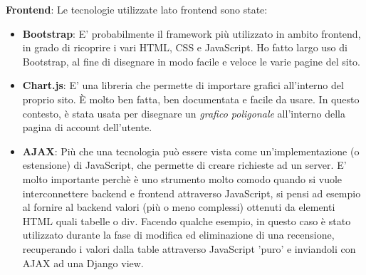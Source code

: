 \documentclass[12pt]{article}
\begin{document}
	\noindent \textbf{Frontend}: Le tecnologie utilizzate lato frontend sono state: 
	\begin{itemize}
		\item \textbf{Bootstrap}: E' probabilmente il framework più utilizzato in ambito frontend, in grado di ricoprire i vari HTML, CSS e JavaScript. Ho fatto largo uso di Bootstrap, al fine di disegnare in modo facile e veloce le varie pagine del sito. \\
		
		\item \textbf{Chart.js}: E' una libreria che permette di importare grafici all'interno del proprio sito. È molto ben fatta, ben documentata e facile da usare. In questo contesto, è stata usata per disegnare un \textit{grafico poligonale} all'interno della pagina di account dell'utente. \\
		
		\item \textbf{AJAX}: Più che una tecnologia può essere vista come un'implementazione (o estensione) di JavaScript, che permette di creare richieste ad un server. E' molto importante perchè è uno strumento molto comodo quando si vuole interconnettere backend e frontend attraverso JavaScript, si pensi ad esempio al fornire al backend valori (più o meno complessi) ottenuti da elementi HTML quali tabelle o div. Facendo qualche esempio, in questo caso è stato utilizzato durante la fase di modifica ed eliminazione di una recensione, recuperando i valori dalla table attraverso JavaScript 'puro' e inviandoli con AJAX ad una Django view.
	\end{itemize}
\end{document}

